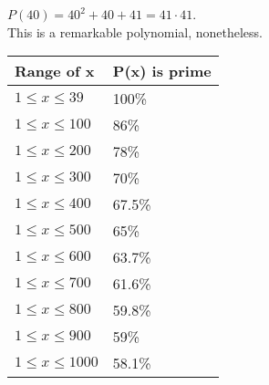 \documentclass[12pt]{article}
\begin{document}
$P(40) = 40^2+40+41 = 41 \cdot 41$.
\\

This is a remarkable polynomial, nonetheless.
\begin{table}[h!]
  \begin{center}
    \begin{tabular}{l|l}
      \textbf{Range of x} & \textbf{P(x) is prime}\\
      \hline
      $1 \leq x \leq 39$ & 100\%\\
      $1 \leq x \leq 100$ & 86\%\\
      $1 \leq x \leq 200$ & 78\%\\
      $1 \leq x \leq 300$ & 70\%\\
      $1 \leq x \leq 400$ & 67.5\%\\
      $1 \leq x \leq 500$ & 65\%\\
      $1 \leq x \leq 600$ & 63.7\%\\
      $1 \leq x \leq 700$ & 61.6\%\\
      $1 \leq x \leq 800$ & 59.8\%\\
      $1 \leq x \leq 900$ & 59\%\\
      $1 \leq x \leq 1000$ & 58.1\%\\
    \end{tabular}
  \end{center}
\end{table}
\end{document}
